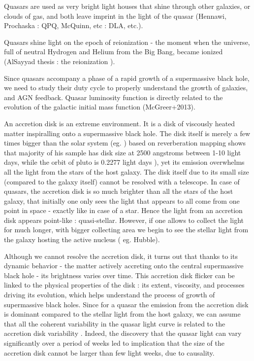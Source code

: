 \documentclass[modern]{aastex62}
\begin{document}
Quasars are used as very bright light houses that shine through other galaxies, or clouds of gas, and both leave imprint in the light of the quasar  (Hennawi, Prochaska : QPQ,  McQuinn, etc : DLA, etc.).

Quasars shine light on the epoch of reionization - the moment when the universe, full of neutral Hydrogen and Helium from the Big Bang, became ionized (AlSayyad thesis : the reionization ). 


Since quasars accompany a phase of a rapid growth of a supermassive black hole, we need to study their duty cycle to properly understand the growth of galaxies, and AGN feedback. Quasar luminosity function is directly related to the evolution of the galactic initial mass function (McGreer+2013). 

An accretion disk is an extreme environment. It is a disk of viscously heated matter inspiralling onto a supermassive black hole. The disk itself is merely a few times bigger than  the solar system  (eg.\cite{mudd2017} ) based on reverberation mapping shows that majority of his sample has disk size at 2500 angstroms between 1-10 light days,  while the orbit of pluto is 0.2277 light days ), yet its emission overwhelms all the light from the stars of the host galaxy.  The disk itself due to its small size (compared to the galaxy itself) cannot be resolved with a telescope. In case of quasars, the accretion disk is so much brighter than all the stars of the host galaxy, that initially one only sees the light that appears to all come from one point in space - exactly like in case of a star. Hence the light from an accretion disk appears point-like : quasi-stellar. However,  if one allows to collect the light for much longer, with bigger collecting area  we begin to see the stellar light from the galaxy hosting the active nucleus ( eg. Hubble). 

Although we cannot resolve the accretion disk, it turns out that thanks to its dynamic behavior  - the matter actively accreting onto the central supermassive black hole - its brightness varies over time. This accretion disk flicker can be linked to the physical properties of the disk : its extent, viscosity, and processes driving its evolution, which helps understand the process of growth of supermassive black holes.  Since for a quasar the emission from the accretion disk is dominant compared to the stellar light from the host galaxy, we can assume that all the coherent variability  in the quasar light curve is related to the accretion disk variability . Indeed, the discovery that the quasar light can vary significantly over a period of weeks led to implication that the size of the accretion disk cannot be larger than few light weeks, due to causality. 
\end{document}
